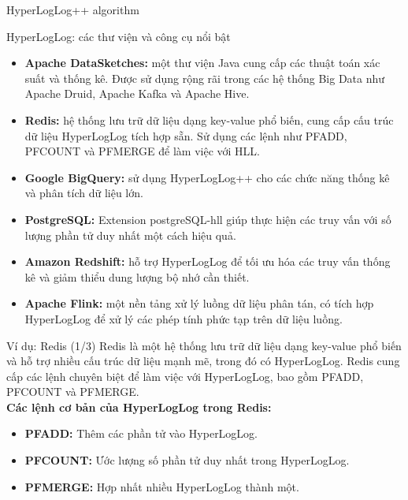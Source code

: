 \documentclass[10pt]{beamer}
\begin{document}
\begin{frame}{HyperLogLog++ algorithm}
\end{frame}

\begin{frame}{HyperLogLog: các thư viện và công cụ nổi bật }
  \begin{itemize}
    \item \textbf{Apache DataSketches:} một thư viện Java cung cấp các thuật toán xác suất và thống kê. Được sử dụng rộng rãi trong các hệ thống Big Data như 
    Apache Druid, Apache Kafka và Apache Hive.
    \item \textbf{Redis:} hệ thống lưu trữ dữ liệu dạng key-value phổ biến, cung cấp 
    cấu trúc dữ liệu HyperLogLog tích hợp sẵn. Sử dụng các lệnh như PFADD, PFCOUNT 
    và PFMERGE để làm việc với HLL.
    \item \textbf{Google BigQuery:} sử dụng HyperLogLog++ cho các chức năng thống kê và phân tích dữ liệu lớn.
    \item \textbf{PostgreSQL:} Extension postgreSQL-hll giúp thực hiện các truy vấn với số lượng phần tử duy nhất một cách hiệu quả.
    \item \textbf{Amazon Redshift:} hỗ trợ HyperLogLog để tối ưu hóa các truy vấn thống kê và giảm thiểu dung lượng bộ nhớ cần thiết.
    \item \textbf{Apache Flink:} một nền tảng xử lý luồng dữ liệu phân tán, 
    có tích hợp HyperLogLog để xử lý các phép tính phức tạp trên dữ liệu luồng.
  \end{itemize}
\end{frame}

\begin{frame}{Ví dụ: Redis (1/3)}
Redis là một hệ thống lưu trữ dữ liệu dạng key-value phổ biến và hỗ trợ nhiều cấu trúc dữ liệu mạnh mẽ, trong đó có HyperLogLog. Redis cung cấp các lệnh chuyên biệt để làm việc với HyperLogLog, bao gồm PFADD, PFCOUNT và PFMERGE.\\
\textbf{Các lệnh cơ bản của HyperLogLog trong Redis:}
  \begin{itemize}
    \item \textbf{PFADD:} Thêm các phần tử vào HyperLogLog.
    \item \textbf{PFCOUNT:} Ước lượng số phần tử duy nhất trong HyperLogLog.
    \item \textbf{PFMERGE:} Hợp nhất nhiều HyperLogLog thành một.
  \end{itemize}
\end{frame}
\end{document}
